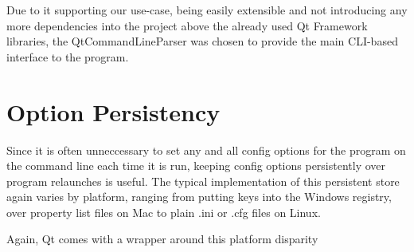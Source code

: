 Due to it supporting our use-case, being easily extensible and not introducing any more dependencies into the project above the already used Qt Framework libraries, the QtCommandLineParser was chosen to provide the main CLI-based interface to the program.


\section{Option Persistency}
Since it is often unneccessary to set any and all config options for the program on the command line each time it is run, keeping config options persistently over program relaunches is useful. The typical implementation of this persistent store again varies by platform, ranging from putting keys into the Windows registry, over property list files on Mac to plain .ini or .cfg files on Linux.

Again, Qt comes with a wrapper around this platform disparity
